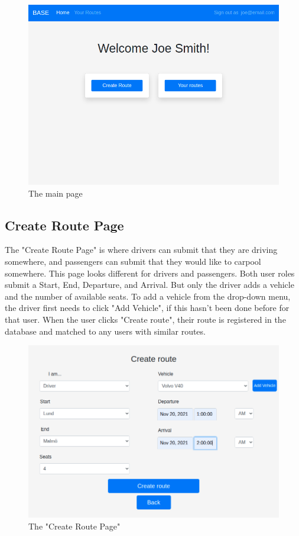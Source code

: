 \documentclass{article}
\begin{document}
\begin{figure}[h!]
    \centering
    \includegraphics[scale=0.5]{ssdFigures/main_page.png}
    \caption{The main page}
    \label{fig:main_page}
\end{figure}

\clearpage
\newpage
\subsection{Create Route Page}
The "Create Route Page" is where drivers can submit that they are driving somewhere, and passengers can submit that they would like to carpool somewhere. This page looks different for drivers and passengers. Both user roles submit a Start, End, Departure, and Arrival. But only the driver adds a vehicle and the number of available seats. To add a vehicle from the drop-down menu, the driver first needs to click "Add Vehicle", if this hasn't been done before for that user. When the user clicks "Create route", their route is registered in the database and matched to any users with similar routes.

\begin{figure}[h!]
    \centering
    \includegraphics[scale=0.48]{ssdFigures/create_route.png}
    \caption{The "Create Route Page"}
    \label{fig:create_route}
\end{figure}
\end{document}
